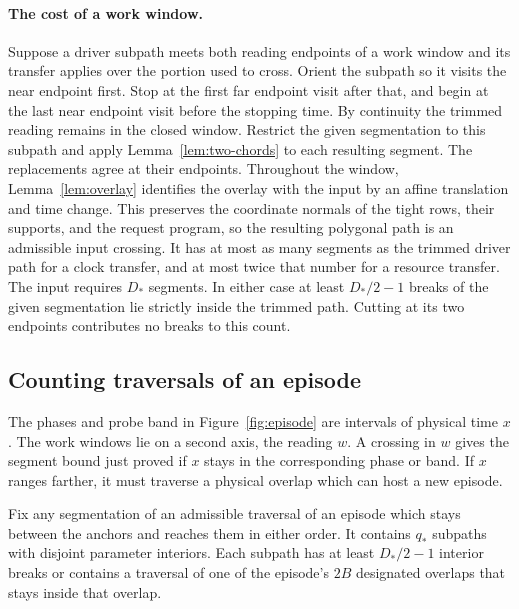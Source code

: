 \paragraph{The cost of a work window.}
Suppose a driver subpath meets both reading endpoints of a work window
and its transfer applies over the portion used to cross. Orient the
subpath so it visits the near endpoint first. Stop at the first far
endpoint visit after that, and begin at the last near endpoint visit
before the stopping time. By continuity the trimmed reading remains
in the closed window. Restrict the given segmentation to this subpath
and apply Lemma~\ref{lem:two-chords} to each resulting segment. The
replacements agree at their endpoints. Throughout the window,
Lemma~\ref{lem:overlay} identifies the overlay with the input by an
affine translation and time change. This preserves the coordinate
normals of the tight rows, their supports, and the request program,
so the resulting polygonal path is an admissible input crossing.
It has at most as many segments as the trimmed driver path for a
clock transfer, and at most twice that number for a resource transfer.
The input requires \(D_*\) segments. In either case at least
\(D_*/2-1\) breaks of the given segmentation lie strictly inside
the trimmed path. Cutting at its two endpoints contributes no breaks
to this count.

\subsection{Counting traversals of an episode}



The phases and probe band in Figure~\ref{fig:episode} are intervals
of physical time \(x\). The work windows lie on a second axis, the
reading \(w\). A crossing in \(w\) gives the segment bound just proved
if \(x\) stays in the corresponding phase or band. If \(x\) ranges
farther, it must traverse a physical overlap which can host a new
episode.

\begin{lemma}\label{lem:episode}
Fix any segmentation of an admissible traversal of an episode which
stays between the anchors and reaches them in either order. It
contains \(q_*\) subpaths with disjoint parameter interiors. Each
subpath has at least \(D_*/2-1\) interior breaks or contains a
traversal of one of the episode's \(2B\) designated overlaps that
stays inside that overlap.
\end{lemma}

